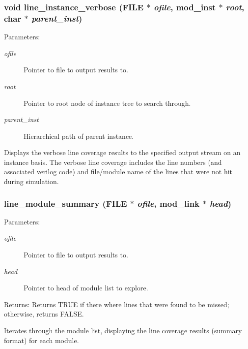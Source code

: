 \subsubsection{\setlength{\rightskip}{0pt plus 5cm}void line\_\-instance\_\-verbose (FILE $\ast$ {\em ofile}, {\bf mod\_\-inst} $\ast$ {\em root}, char $\ast$ {\em parent\_\-inst})}\label{line_8c_a10}


\begin{Desc}
\item[Parameters:]
\begin{description}
\item[{\em ofile}]Pointer to file to output results to. \item[{\em root}]Pointer to root node of instance tree to search through. \item[{\em parent\_\-inst}]Hierarchical path of parent instance.\end{description}
\end{Desc}
Displays the verbose line coverage results to the specified output stream on an instance basis. The verbose line coverage includes the line numbers (and associated verilog code) and file/module name of the lines that were not hit during simulation. 
\subsubsection{ line\_\-module\_\-summary (FILE $\ast$ {\em ofile}, {\bf mod\_\-link} $\ast$ {\em head})}\label{line_8c_a8}


\begin{Desc}
\item[Parameters:]
\begin{description}
\item[{\em ofile}]Pointer to file to output results to. \item[{\em head}]Pointer to head of module list to explore.\end{description}
\end{Desc}
\begin{Desc}
\item[Returns:]Returns TRUE if there where lines that were found to be missed; otherwise, returns FALSE.\end{Desc}
Iterates through the module list, displaying the line coverage results (summary format) for each module. 
